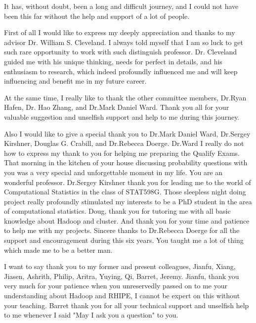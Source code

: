 \begin{acknowledgments}

It has, without doubt, been a long and difficult journey, and I could not have 
been this far without the help and support of a lot of people.

First of all I would like to express my deeply appreciation and thanks to my 
advisor Dr. William S. Cleveland. I always told myself that I am so luck to get 
such rare opportunity to work with such distinguish professor. Dr. Cleveland 
guided me with his unique thinking, needs for perfect in details, and his 
enthusiasm to research, which indeed profoundly influenced me and will keep 
influencing and benefit me in my future career.

At the same time, I really like to thank the other committee members, Dr.Ryan 
Hafen, Dr. Hao Zhang, and Dr.Mark Daniel Ward. Thank you all for your valuable 
suggestion and unselfish support and help to me during this journey.

Also I would like to give a special thank you to Dr.Mark Daniel Ward, Dr.Sergey
Kirshner, Douglas G. Crabill, and Dr.Rebecca Doerge. Dr.Ward I really do not how 
to express my thank to you for helping me preparing the Qualify Exams. That 
morning in the kitchen of your house discussing probability questions with you 
was a very special and unforgettable moment in my life. You are an wonderful 
professor. Dr.Sergey Kirshner thank you for leading me to the world of 
Computational Statistics in the class of STAT598G. Those sleepless night doing 
project really profoundly stimulated my interests to be a PhD student in the area 
of computational statistics. Doug, thank you for tutoring me with all basic 
knowledge about Hadoop and cluster. And thank you for your time and patience to 
help me with my projects. Sincere thanks to Dr.Rebecca Doerge for all the support 
and encouragement during this six years. You taught me a lot of thing which made 
me to be a better man.

I want to say thank you to my former and present colleagues, Jianfu, Xiang, 
Jiasen, Ashrith, Philip, Aritra, Yuying, Qi, Barret, Jeremy. Jianfu, thank you 
very much for your patience when you unreservedly passed on to me your 
understanding about Hadoop and RHIPE, I cannot be expert on this without your 
teaching. Barret thank you for all your technical support and unselfish help to 
me whenever I said "May I ask you a question" to you. 


\end{acknowledgments}
